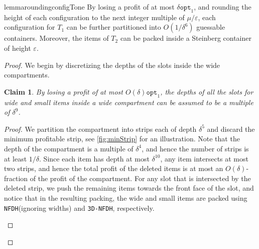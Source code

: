 \documentclass[10pt,a4paper]{amsart}
\newcommand{\eps}{\varepsilon}
\renewcommand{\epsilon}{\varepsilon} %
\newcommand{\NFDH}{\texttt{NFDH}\xspace}
\newcommand{\tNFDH}{\texttt{3D-NFDH}\xspace}
\newtheorem{claim}[theorem]{Claim}
\theoremstyle{definition}
\newcommand{\opt}{\mathtt{opt}}
\begin{document}
\begin{restatable}{lemma}{roundingconfigTone}
\label{lem:roundingconfigTone}
    By losing a profit of at most $\delta \opt_1$, and rounding the height of each configuration to the next integer multiple of $\mu/\epsilon$, each configuration for $T_1$ can be further partitioned into $O(1/\delta^6)$ guessable containers. Moreover, the items of $T_2$ can be packed inside a Steinberg container of height $\eps$.
\end{restatable}
\begin{proof}
We begin by discretizing the depths of the slots inside the wide compartments.

\begin{claim}
\label{lem:slotsandregions}
     By losing a profit of at most $O(\delta)\opt_1$, the depths of all the slots for wide and small items inside a wide compartment can be assumed to be a multiple of $\delta^9$.
\end{claim}
\begin{proof}
 We partition the compartment into strips each of depth $\delta^5$ and discard the minimum profitable strip, see \cref{fig:minStrip} for an illustration. Note that the depth of the compartment is a multiple of $\delta^4$, and hence the number of strips is at least $1/\delta$. Since each item has depth at most $\delta^{10}$, any item intersects at most two strips, and hence the total profit of the deleted items is at most an $O(\delta)$-fraction of the profit of the compartment. For any slot that is intersected by the deleted strip, we push the remaining items towards the front face of the slot, and notice that
 in the resulting packing, the wide and small items are packed using \NFDH (ignoring widths) and \tNFDH, respectively.

 \begin{figure}
    \centering
    
                    

\end{figure}
\end{proof}
\end{proof}
\end{document}
